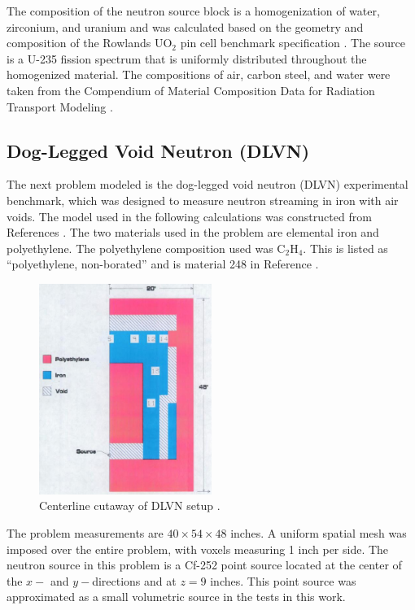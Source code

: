 \documentclass{article} %
\begin{document}
The composition of the neutron source block is a homogenization of water,
zirconium, and uranium and was calculated based on the geometry and composition
of the Rowlands UO$_2$ pin cell benchmark specification \cite{pincell}. The
source is a U-235 fission 
spectrum that is uniformly distributed throughout the homogenized material. The
compositions of air, carbon steel, and water were taken from the Compendium of 
Material Composition Data for Radiation Transport Modeling \cite{pnnl}.

\subsection{Dog-Legged Void Neutron (DLVN)}

The next problem modeled is the dog-legged void neutron (DLVN) experimental 
benchmark, which was designed to measure neutron streaming in iron with air
voids. The model used in the following calculations was constructed from
References \cite{sw-dlvn,j-dlvn,dlvn1991}. The two materials used in the
problem are elemental iron and polyethylene. The polyethylene composition used
was C$_2$H$_4$. This is listed as ``polyethylene, non-borated'' and is material
248 in Reference \cite{pnnl}. 

\begin{figure}[!htb]
\centering
\includegraphics[width=0.5\textwidth]{img/dlvn.png}
\caption{Centerline cutaway of DLVN setup \cite{sw-dlvn}.}
\label{dlvn}
\end{figure}

The problem measurements are $40\times54\times48$ inches. A uniform spatial
mesh was imposed over the entire problem, with voxels measuring 1 inch per
side. The neutron source in this problem is a Cf-252 point source located at
the center of the $x-$ and $y-$directions and at $z = 9$ inches. This point
source was approximated as a small volumetric source in the tests in this
work.
\end{document}
